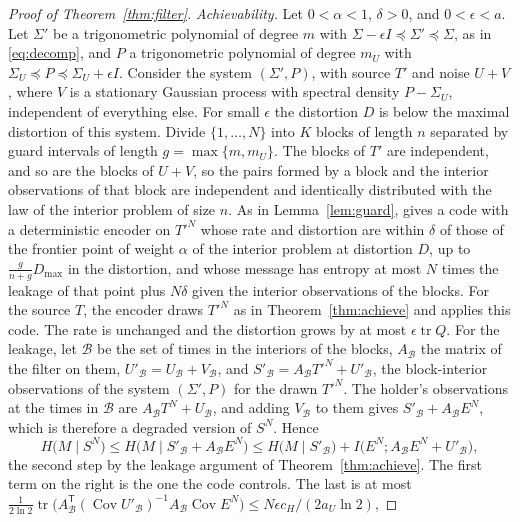\documentclass[11pt,onecolumn]{IEEEtran}
\newcommand{\tr}{\operatorname{tr}}
\newcommand{\Cov}{\operatorname{Cov}}
\begin{document}
\begin{proof}[Proof of Theorem~\ref{thm:filter}]
\emph{Achievability.} Let $0<\alpha<1$, $\delta>0$, and
$0<\epsilon<a$. Let $\Sigma'$ be a trigonometric polynomial of degree
$m$ with $\Sigma-\epsilon I\preceq\Sigma'\preceq\Sigma$, as in
\eqref{eq:decomp}, and $P$ a trigonometric polynomial of degree $m_U$
with $\Sigma_U\preceq P\preceq\Sigma_U+\epsilon I$. Consider the system
$(\Sigma',P)$, with source $T'$ and noise $U+V$, where $V$ is a
stationary Gaussian process with spectral density $P-\Sigma_U$,
independent of everything else. For small $\epsilon$ the distortion $D$
is below the maximal distortion of this system. Divide $\{1,\dots,N\}$ into $K$ blocks
of length $n$ separated by guard intervals of length
$g=\max\{m,m_U\}$. The blocks of $T'$ are independent, and so are the
blocks of $U+V$, so the pairs formed by a block and the interior
observations of that block are independent and identically distributed
with the law of the interior problem of size $n$. As in
Lemma~\ref{lem:guard}, \cite[Theorem~3]{part1} gives a code with a
deterministic encoder on $T'^N$ whose rate and distortion are within
$\delta$ of those of the frontier point of weight $\alpha$ of the
interior problem at distortion $D$, up to $\tfrac g{n+g}D_{\max}$ in the
distortion, and whose message has entropy at most $N$ times the
leakage of that point plus $N\delta$ given the interior observations of
the blocks. For the source $T$, the encoder draws $T'^N$ as in
Theorem~\ref{thm:achieve} and applies this code. The rate is unchanged
and the distortion grows by at most $\epsilon\tr Q$. For the leakage,
let $\mathcal B$ be the set of times in the interiors of the blocks,
$A_{\mathcal B}$ the matrix of the filter on them,
$U'_{\mathcal B}=U_{\mathcal B}+V_{\mathcal B}$, and
$S'_{\mathcal B}=A_{\mathcal B}T'^N+U'_{\mathcal B}$, the block-interior
observations of the system $(\Sigma',P)$ for the drawn $T'^N$. The
holder's observations at the times in $\mathcal B$ are
$A_{\mathcal B}T^N+U_{\mathcal B}$, and adding $V_{\mathcal B}$ to them
gives $S'_{\mathcal B}+A_{\mathcal B}E^N$, which is therefore a degraded
version of $S^N$. Hence
\begin{equation}
H\bigl(M\mid S^N\bigr)\le H\bigl(M\mid S'_{\mathcal B}+A_{\mathcal B}E^N\bigr)
\le H\bigl(M\mid S'_{\mathcal B}\bigr)+I\bigl(E^N;A_{\mathcal B}E^N+U'_{\mathcal B}\bigr),
\label{eq:achchain}
\end{equation}
the second step by the leakage argument of Theorem~\ref{thm:achieve}.
The first term on the right is the one the code controls. The last is
at most
$\tfrac1{2\ln2}\tr\bigl(A_{\mathcal B}^{\mathsf T}(\Cov U'_{\mathcal B})^{-1}A_{\mathcal B}\Cov E^N\bigr)\le N\epsilon c_H/(2a_U\ln2)$,

\end{proof}
\end{document}
